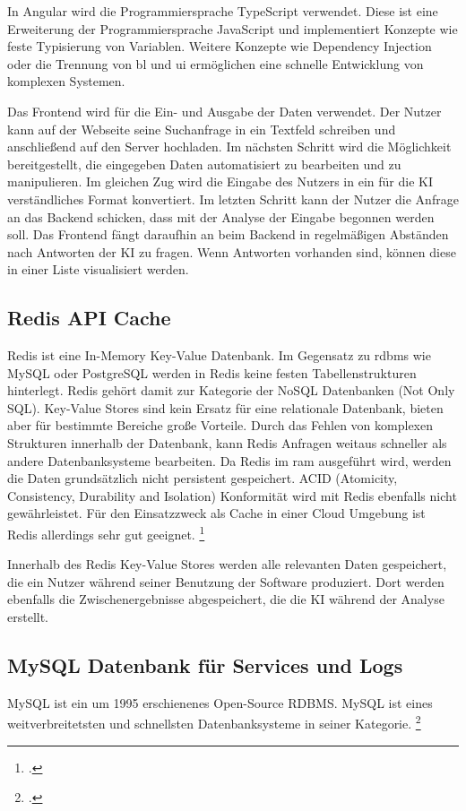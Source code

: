 In Angular wird die Programmiersprache TypeScript verwendet. Diese ist eine Erweiterung der Programmiersprache JavaScript und implementiert Konzepte wie feste Typisierung von Variablen. Weitere Konzepte wie Dependency Injection oder die Trennung von \ac{bl} und \ac{ui} ermöglichen eine schnelle Entwicklung von komplexen Systemen. 

Das Frontend wird für die Ein- und Ausgabe der Daten verwendet. Der Nutzer kann auf der Webseite seine Suchanfrage in ein Textfeld schreiben und anschließend auf den Server hochladen. Im nächsten Schritt wird die Möglichkeit bereitgestellt, die eingegeben Daten automatisiert zu bearbeiten und zu manipulieren. Im gleichen Zug wird die Eingabe des Nutzers in ein für die KI verständliches Format konvertiert. Im letzten Schritt kann der Nutzer die Anfrage an das Backend schicken, dass mit der Analyse der Eingabe begonnen werden soll. Das Frontend fängt daraufhin an beim Backend in regelmäßigen Abständen nach Antworten der KI zu fragen. Wenn Antworten vorhanden sind, können diese in einer Liste visualisiert werden.

\subsection{Redis API Cache}
Redis ist eine In-Memory Key-Value Datenbank. Im Gegensatz zu  \ac{rdbms} wie MySQL oder PostgreSQL werden in Redis keine festen Tabellenstrukturen hinterlegt. Redis gehört damit zur Kategorie der NoSQL Datenbanken (Not Only SQL). Key-Value Stores sind kein Ersatz für eine relationale Datenbank, bieten aber für bestimmte Bereiche große Vorteile. Durch das Fehlen von komplexen Strukturen innerhalb der Datenbank, kann Redis Anfragen weitaus schneller als andere Datenbanksysteme bearbeiten. Da Redis im \ac{ram} ausgeführt wird,  werden die Daten grundsätzlich nicht persistent gespeichert. ACID (Atomicity, Consistency, Durability and Isolation) Konformität wird mit Redis ebenfalls nicht gewährleistet. Für den Einsatzzweck als Cache in einer Cloud Umgebung ist Redis allerdings sehr gut geeignet. \footcite{paksula2010persisting}

Innerhalb des Redis Key-Value Stores werden alle relevanten Daten gespeichert, die ein Nutzer während seiner Benutzung der Software produziert. Dort werden ebenfalls die Zwischenergebnisse abgespeichert, die die KI während der Analyse erstellt.

\subsection{MySQL Datenbank für Services und Logs}
MySQL ist ein um 1995 erschienenes Open-Source RDBMS. MySQL ist eines weitverbreitetsten und schnellsten Datenbanksysteme in seiner Kategorie. \footcite{dubois2008mysql}

